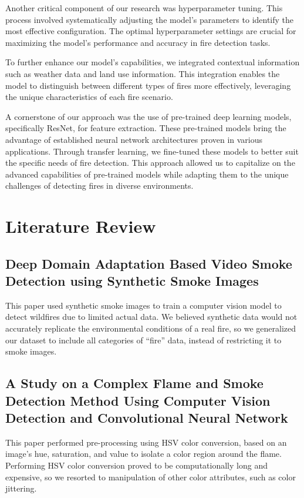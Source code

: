 Another critical component of our research was hyperparameter tuning. This process involved systematically adjusting the model's parameters to identify the most effective configuration. The optimal hyperparameter settings are crucial for maximizing the model's performance and accuracy in fire detection tasks.

To further enhance our model's capabilities, we integrated contextual information such as weather data and land use information. This integration enables the model to distinguish between different types of fires more effectively, leveraging the unique characteristics of each fire scenario.

A cornerstone of our approach was the use of pre-trained deep learning models, specifically ResNet, for feature extraction. These pre-trained models bring the advantage of established neural network architectures proven in various applications. Through transfer learning, we fine-tuned these models to better suit the specific needs of fire detection. This approach allowed us to capitalize on the advanced capabilities of pre-trained models while adapting them to the unique challenges of detecting fires in diverse environments.

\section{Literature Review}

\subsection{Deep Domain Adaptation Based Video Smoke Detection using Synthetic Smoke Images~\citep{Xu2017}}

This paper used synthetic smoke images to train a computer vision model to detect wildfires due to limited actual data. We believed synthetic data would not accurately replicate the environmental conditions of a real fire, so we generalized our dataset to include all categories of “fire” data, instead of restricting it to smoke images.

\subsection{A Study on a Complex Flame and Smoke Detection Method Using Computer Vision Detection and Convolutional Neural Network
	~\citep{fire5040108}}

This paper performed pre-processing using HSV color conversion, based on an image’s hue, saturation, and value to isolate a color region around the flame. Performing HSV color conversion proved to be computationally long and expensive, so we resorted to manipulation of other color attributes, such as color jittering.
	
